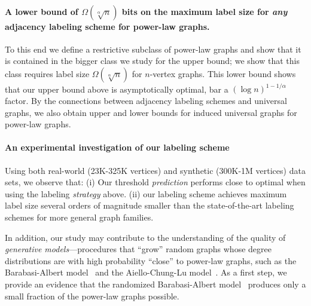 \paragraph{A lower bound of $\Omega(\sqrt[\alpha]{n})$ bits on the maximum label size for \emph{any} adjacency labeling scheme for power-law graphs.}
To this end we define a  restrictive subclass of power-law graphs and show that it is contained in the bigger class we study for the upper bound; we show that this class requires label size $\Omega(\sqrt[\alpha]{n})$ for $n$-vertex graphs.
This lower bound shows that our upper bound above is asymptotically  optimal, bar a $(\log n)^{1 - 1/\alpha}$ factor.
By the connections between adjacency labeling schemes and universal graphs, we also obtain upper and lower bounds for induced universal graphs for power-law graphs. 


\paragraph{An experimental investigation  of our labeling scheme}
Using both real-world (23K-325K vertices) and synthetic (300K-1M vertices) data sets, we observe that:
(i) Our threshold \emph{prediction} performs close to optimal when using the labeling \emph{strategy} above. 
(ii) our labeling scheme achieves maximum label size several orders of magnitude smaller than the state-of-the-art labeling schemes for more general graph families.
\vspace{\baselineskip}

In addition, our study  may contribute to  the understanding of the quality of  \emph{generative models}---procedures that ``grow'' random graphs whose degree distributions are with high probability ``close'' to power-law graphs,  such as the Barabasi-Albert model~\cite{barabasi1999emergence} and the   Aiello-Chung-Lu model~\cite{aiello2001random}. As a first step, we provide an evidence  that the randomized Barabasi-Albert model~\cite{barabasi1999emergence} produces only a small fraction of the power-law graphs possible.








